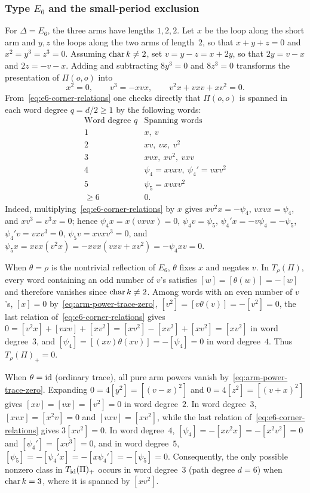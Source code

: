 \subsubsection{Type $E_6$ and the small-period exclusion}

For $\Delta=E_6$, the three arms have lengths $1,2,2$. Let $x$ be the loop along the short arm and $y,z$ the loops along the two arms of length~$2$, so that $x+y+z=0$ and $x^2=y^3=z^3=0$. Assuming $\operatorname{char} k\ne2$, set $v=y-z=x+2y$, so that $2y=v-x$ and $2z=-v-x$. Adding and subtracting $8y^3=0$ and $8z^3=0$ transforms the presentation of $\Pi(o,o)$ into
\begin{equation}
  x^2=0,\qquad v^3=-xvx,\qquad v^2x+vxv+xv^2=0.
  \label{eq:e6-corner-relations}
\end{equation}
From~\eqref{eq:e6-corner-relations} one checks directly that $\Pi(o,o)$ is spanned in each word degree $q=d/2\geq1$ by the following words:
\[
\begin{array}{c|l}
\text{Word degree }q & \text{Spanning words} \\\hline
1 & x,\ v \\
2 & xv,\ vx,\ v^2 \\
3 & xvx,\ xv^2,\ vxv \\
4 & \psi_4=xvxv,\ \psi_4'=vxv^2 \\
5 & \psi_5=xvxv^2 \\
\geq6 & 0.
\end{array}
\]
Indeed, multiplying~\eqref{eq:e6-corner-relations} by $x$ gives $xv^2x=-\psi_4$, $vxvx=\psi_4$, and $xv^3=v^3x=0$; hence $\psi_4x=x(vxvx)=0$, $\psi_4v=\psi_5$, $\psi_4'x=-v\psi_4=-\psi_5$, $\psi_4'v=vxv^3=0$, $\psi_5v=xvxv^3=0$, and $\psi_5x=xvx(v^2x)=-xvx(vxv+xv^2)=-\psi_4xv=0$.

When $\theta=\rho$ is the nontrivial reflection of $E_6$, $\theta$ fixes $x$ and negates $v$. In $T_\rho(\Pi)$, every word containing an odd number of $v$'s satisfies $[w]=[\theta(w)]=-[w]$ and therefore vanishes since $\operatorname{char} k\ne2$. Among words with an even number of $v$'s, $[x]=0$ by~\eqref{eq:arm-power-trace-zero}, $[v^2]=[v\theta(v)]=-[v^2]=0$, the last relation of~\eqref{eq:e6-corner-relations} gives $0=[v^2x]+[vxv]+[xv^2]=[xv^2]-[xv^2]+[xv^2]=[xv^2]$ in word degree~$3$, and $[\psi_4]=[(xv)\theta(xv)]=-[\psi_4]=0$ in word degree~$4$. Thus $T_\rho(\Pi)_+=0$.

When $\theta=\operatorname{id}$ (ordinary trace), all pure arm powers vanish by~\eqref{eq:arm-power-trace-zero}. Expanding $0=4[y^2]=[(v-x)^2]$ and $0=4[z^2]=[(v+x)^2]$ gives $[xv]=[vx]=[v^2]=0$ in word degree~$2$. In word degree~$3$, $[xvx]=[x^2v]=0$ and $[vxv]=[xv^2]$, while the last relation of~\eqref{eq:e6-corner-relations} gives $3[xv^2]=0$. In word degree~$4$, $[\psi_4]=-[xv^2x]=-[x^2v^2]=0$ and $[\psi_4']=[xv^3]=0$, and in word degree~$5$, $[\psi_5]=-[\psi_4'x]=-[x\psi_4']=-[\psi_5]=0$. Consequently, the only possible nonzero class in $T_{\operatorname{id}}(\Pi)_+$ occurs in word degree~$3$ (path degree $d=6$) when $\operatorname{char} k=3$, where it is spanned by $[xv^2]$.

